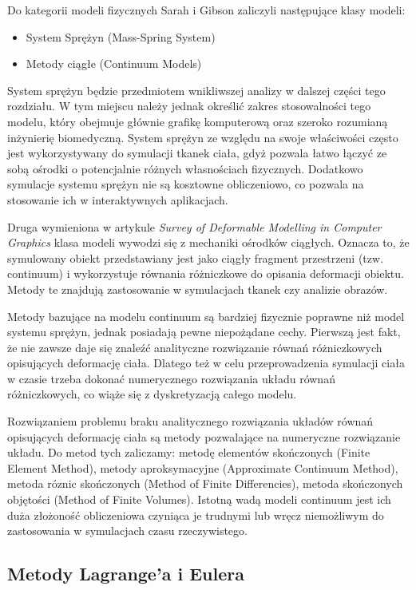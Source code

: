 Do kategorii modeli fizycznych Sarah i Gibson zaliczyli następujące klasy modeli:
\begin{itemize}
\item System Sprężyn (Mass-Spring System)
\item Metody ciągłe (Continuum Models)
\end{itemize}

System sprężyn będzie przedmiotem wnikliwszej analizy w dalszej części tego
rozdziału. W tym miejscu należy jednak określić zakres stosowalności tego
modelu, który obejmuje głównie grafikę komputerową oraz szeroko rozumianą
inżynierię biomedyczną. System sprężyn ze względu na swoje właściwości 
często jest wykorzystywany do symulacji tkanek ciała, gdyż pozwala łatwo łączyć ze
sobą ośrodki o potencjalnie różnych własnościach fizycznych. Dodatkowo symulacje
systemu sprężyn nie są kosztowne obliczeniowo, co pozwala na stosowanie ich w
interaktywnych aplikacjach.

Druga wymieniona w artykule \textit{Survey of Deformable Modelling in Computer Graphics}
klasa modeli wywodzi się z mechaniki ośrodków
ciągłych. Oznacza to, że symulowany obiekt przedstawiany jest jako ciągły
fragment przestrzeni (tzw. continuum) i wykorzystuje równania różniczkowe do
opisania deformacji obiektu. Metody te znajdują zastosowanie w symulacjach
tkanek czy analizie obrazów.\cite{TR97-19}

Metody bazujące na modelu continuum są bardziej fizycznie poprawne niż model
systemu sprężyn\cite{TR97-19}, jednak posiadają pewne niepożądane cechy.
Pierwszą jest fakt, że nie zawsze daje się znaleźć analityczne rozwiązanie
równań różniczkowych opisujących deformację ciała. Dlatego też w celu
przeprowadzenia symulacji ciała w czasie trzeba dokonać numerycznego rozwiązania
układu równań różniczkowych, co wiąże się z dyskretyzacją całego modelu.

Rozwiązaniem problemu braku analitycznego rozwiązania układów równań opisujących
deformację ciała są metody pozwalające na numeryczne rozwiązanie układu. Do
metod tych zaliczamy: metodę elementów skończonych (Finite Element Method),
 metody aproksymacyjne (Approximate Continuum Method), metoda róznic skończonych
 (Method of Finite Differencies), metoda skończonych objętości (Method of Finite
 Volumes). Istotną wadą modeli continuum jest ich duża złożoność obliczeniowa
czyniąca je trudnymi lub wręcz niemożliwym do zastosowania w symulacjach czasu
rzeczywistego.

\subsection{Metody Lagrange'a i Eulera}

